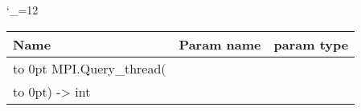 \begingroup \catcode`\_=12 \tt
\begin{tabular}{lll}
\toprule
\textrm{Name}&\textrm{Param name}&\textrm{param type}\\
\midrule
\hbox to 0pt {MPI.Query_thread(\hss}\\
\hbox to 0pt{) -> int\hss}\\
\bottomrule
\end{tabular}
\endgroup
